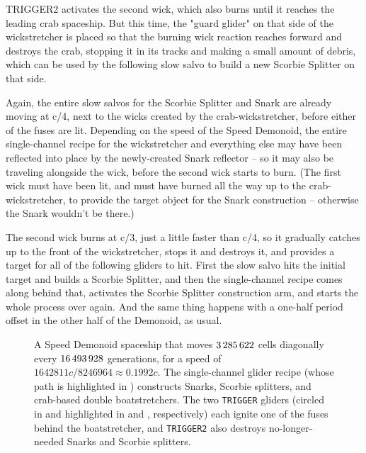 TRIGGER2 activates the second wick, which also burns until it reaches the leading crab spaceship. But this time, the "guard glider" on that side of the wickstretcher is placed so that the burning wick reaction reaches forward and destroys the crab, stopping it in its tracks and making a small amount of debris, which can be used by the following slow salvo to build a new Scorbie Splitter on that side.

Again, the entire slow salvos for the Scorbie Splitter and Snark are already moving at c/4, next to the wicks created by the crab-wickstretcher, before either of the fuses are lit. Depending on the speed of the Speed Demonoid, the entire single-channel recipe for the wickstretcher and everything else may have been reflected into place by the newly-created Snark reflector -- so it may also be traveling alongside the wick, before the second wick starts to burn. (The first wick must have been lit, and must have burned all the way up to the crab-wickstretcher, to provide the target object for the Snark construction -- otherwise the Snark wouldn't be there.)

The second wick burns at c/3, just a little faster than c/4, so it gradually catches up to the front of the wickstretcher, stops it and destroys it, and provides a target for all of the following gliders to hit. First the slow salvo hits the initial target and builds a Scorbie Splitter, and then the single-channel recipe comes along behind that, activates the Scorbie Splitter construction arm, and starts the whole process over again. And the same thing happens with a one-half period offset in the other half of the Demonoid, as usual.

\begin{figure}[!htbp]
	\centering
	\caption{A Speed Demonoid spaceship that moves $3{\,}285{\,}622$ cells diagonally every $16{\,}493{\,}928$ generations, for a speed of $1642811c/8246964 \approx 0.1992c$. The single-channel glider recipe (whose path is highlighted in ) constructs Snarks, Scorbie splitters, and crab-based double boatstretchers. The two \texttt{TRIGGER} gliders (circled in  and highlighted in  and , respectively) each ignite one of the fuses behind the boatstretcher, and \texttt{TRIGGER2} also destroys no-longer-needed Snarks and Scorbie splitters.}\label{fig:speed_demonoid}
\end{figure}


